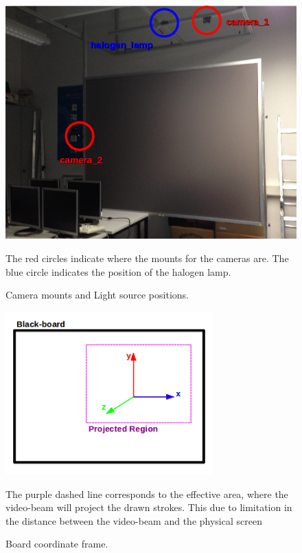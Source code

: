\documentclass[a4paper,12pt]{article}
\begin{document}
\begin{figure}[H]
    \begin{center}
	\includegraphics[width=12cm]{setupCams}
	\caption{Camera mounts and Light source positions.}
    The red circles indicate where the mounts for the cameras are. The blue circle indicates the position of the halogen lamp.
	\label{fig:setupcams}
    \end{center}
\end{figure}

\begin{figure}[H]
    \begin{center}
	\includegraphics[width=8cm]{boardCoordinates}
	\caption{Board coordinate frame.}
    The purple dashed line corresponds to the effective area, where the video-beam will project the drawn strokes. This due to limitation in the distance between the video-beam and the physical screen
	\label{fig:board}
    \end{center}
\end{figure}

\end{document}
